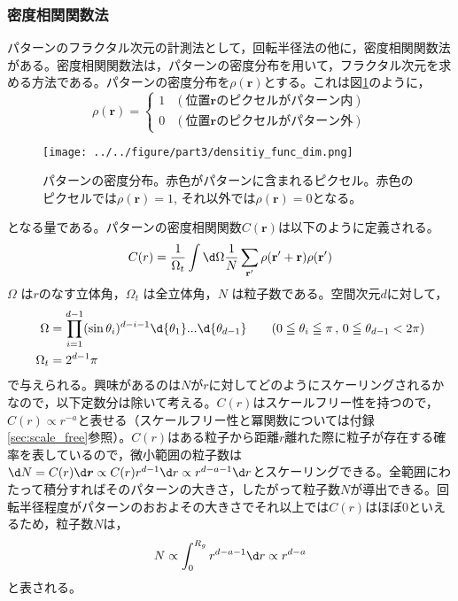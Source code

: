 \documentclass[autodetect-engine,dvi=dvipdfmx,a4paper,ja=standard,oneside,openany,11pt,draft]{bxjsbook}
\begin{document}
\subsubsection{密度相関関数法}
\label{sec:density_correlation}
パターンのフラクタル次元の計測法として，回転半径法の他に，密度相関関数法がある。密度相関関数法は，パターンの密度分布を用いて，フラクタル次元を求める方法である。パターンの密度分布を$\rho(\bm{r})$とする。これは図\ref{fig:density_func_dif}のように，
\begin{equation}
  \rho(\bm{r})=
  \begin{cases}
    1 & (\mathrm{位置}\bm{r}\mathrm{のピクセルがパターン内}) \\
    0 & (\mathrm{位置}\bm{r}\mathrm{のピクセルがパターン外})
  \end{cases}
  \label{eq:density_distribution}
\end{equation}

\begin{figure}[htbp]
  \centering
  \texttt{[image: ../../figure/part3/densitiy\_func\_dim.png]}
  \caption{パターンの密度分布。赤色がパターンに含まれるピクセル。赤色のピクセルでは$\rho(\bm{r})=1$, それ以外では$\rho(\bm{r})=0$となる。}
  \label{fig:density_func_dif}
\end{figure}

となる量である。パターンの密度相関関数$C(\bm{r})$は以下のように定義される。
\begin{equation}
  C(r)=\frac{1}{\Omega_t}\int \d\Omega \frac{1}{N}\sum_{{\bf{r'}}}\rho({\bf r'+ r})\rho({\bf {r'}})
  \label{eq:density_correlation}
\end{equation}
$\Omega$ は$r$のなす立体角，$\Omega_t$ は全立体角，$N$ は粒子数である。空間次元$d$に対して，
\begin{equation}
  \begin{aligned}
    \Omega   & =\prod^{d-1}_{i=1} (\sin\theta_i)^{d-i-1} \d{\theta_1}...\d{\theta_{d-1}} \qquad(0\leqq \theta_i\leqq \pi\,,\,0\leqq\theta_{d-1}<2\pi) \\
    \Omega_t & =2^{d-1}\pi
  \end{aligned}
  \label{eq:omega}
\end{equation}
で与えられる。興味があるのは$N$が$r$に対してどのようにスケーリングされるかなので，以下定数分は除いて考える。$C(r)$はスケールフリー性を持つので，$C(r)\propto r^{-a}$と表せる（スケールフリー性と冪関数については付録\ref{sec:scale_free}参照）。$C(r)$はある粒子から距離$r$離れた際に粒子が存在する確率を表しているので，微小範囲の粒子数は$\d N=C(r)\d \bm{r}\propto C(r)r^{d-1}\d r\propto r^{d-a-1} \d r $とスケーリングできる。全範囲にわたって積分すればそのパターンの大きさ，したがって粒子数$N$が導出できる。回転半径程度がパターンのおおよその大きさでそれ以上では$C(r)$はほぼ0といえるため，粒子数$N$は，
\begin{equation}
  N\propto \int_{0}^{R_g} r^{d-a-1} \d r\propto r^{d-a}
  \label{eq:density_correlation_fractal}
\end{equation}
と表される。
\end{document}

